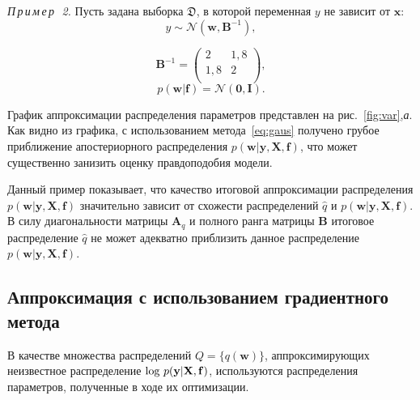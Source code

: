 \documentclass[12pt]{a&t}
\begin{document}
\textsl{П\,р\,и\,м\,е\,р~\,2.}
Пусть  задана выборка $\mathfrak{D}$, в которой переменная ${y}$ не зависит от $\mathbf{x}$:
\begin{equation}
\label{eq:example_post}
	{y} \sim \mathcal{N}(\mathbf{w}, \mathbf{B}^{-1}),
\end{equation}

\[
	\mathbf{B}^{-1} = \left( \begin{array}{cc}
	2 & 1,8 \\
	1,8 & 2\\
	\end{array}  \right),
\]
\[
	p(\mathbf{w}|\mathbf{f}) = \mathcal{N}(\mathbf{0}, \mathbf{I}).
\]

График аппроксимации распределения параметров представлен на рис.~\ref{fig:var},\textit{а}. Как видно из графика, с использованием метода~\eqref{eq:gaus} получено грубое приближение апостериорного распределения $p(\mathbf{w}|\mathbf{y}, \mathbf{X}, \mathbf{f})$, что может существенно занизить оценку правдоподобия модели.



{Данный пример показывает, что качество итоговой аппроксимации распределения $p(\mathbf{w}|\mathbf{y}, \mathbf{X}, \mathbf{f})$ значительно зависит от схожести распределений $\hat{q}$ и $p(\mathbf{w}|\mathbf{y}, \mathbf{X}, \mathbf{f})$. В силу диагональности матрицы $\mathbf{A}_q$ и полного ранга матрицы $\mathbf{B}$  итоговое распределение $\hat{q}$ не может адекватно приблизить данное распределение  $p(\mathbf{w}|\mathbf{y}, \mathbf{X}, \mathbf{f})$.}



\subsection{Аппроксимация с использованием градиентного метода}
В качестве множества распределений $Q = \{q(\mathbf{w})\}$, аппроксимирующих неизвестное распределение $\textnormal{log}~p(\mathbf{y}|\mathbf{X},\mathbf{f})$, используются распределения параметров, полученные в ходе их оптимизации. 
\end{document}
